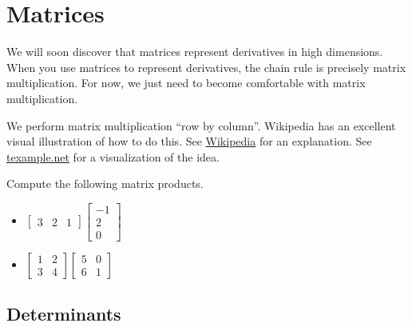 \section{Matrices}\label{review matrices}
We will soon discover that matrices represent derivatives in high dimensions. When you use matrices to represent derivatives, the chain rule is precisely matrix multiplication. For now, we just need to become comfortable with matrix multiplication.

We perform matrix multiplication ``row by column''.  Wikipedia has an excellent visual illustration of how to do this. See 
\href{http://en.wikipedia.org/wiki/Matrix\_multiplication}{Wikipedia} for an explanation. See \href{http://www.texample.net/tikz/examples/matrix-multiplication/}{texample.net} for a visualization of the idea.

\begin{problem} 
Compute the following matrix products.
\begin{itemize}
\item $\begin{bmatrix}
3 & 2& 1
\end{bmatrix}
\begin{bmatrix}
-1 \\
 2\\
 0
\end{bmatrix}$
\item
$\begin{bmatrix}1 &2\\3&4\end{bmatrix}\begin{bmatrix}5&0\\6&1\end{bmatrix}$
\end{itemize} \end{problem}

\subsection{Determinants}



